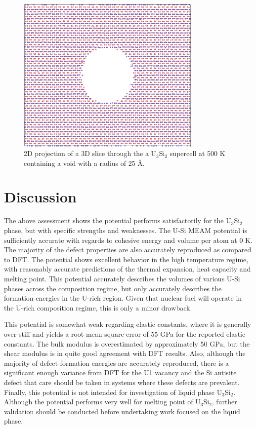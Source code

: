\documentclass[review]{elsarticle}
\begin{document}
\begin{figure}[bt]
	\centering
	\includegraphics[width=0.8\textwidth]{void3.png}
    \caption{2D projection of a 3D slice through the a U$_{3}$Si$_{2}$ supercell at 500 K containing a void with a radius of 25 {\AA}.  }\label{fig:void}
\end{figure}

\FloatBarrier
\clearpage

\section{Discussion}

The above assessment shows the potential performs satisfactorily for the U$_{3}$Si$_{2}$ phase, but with specific strengths and weaknesses.  The U-Si MEAM potential is sufficiently accurate with regards to cohesive energy and volume per atom at 0 K.  The majority of the defect properties are also accurately reproduced as compared to DFT.  The potential shows excellent behavior in the high temperature regime, with reasonably accurate predictions of the thermal expansion, heat capacity and melting point.  This potential accurately describes the volumes of various U-Si phases across the composition regime, but only accurately describes the formation energies in the U-rich region.  Given that nuclear fuel will operate in the U-rich composition regime, this is only a minor drawback.  

This potential is somewhat weak regarding elastic constants, where it is generally over-stiff and yields a root mean square error of 55 GPa for the reported elastic constants.  The bulk modulus is overestimated by approximately 50 GPa, but the shear modulus is in quite good agreement with DFT results.  Also, although the majority of defect formation energies are accurately reproduced, there is a significant enough variance from DFT for the U1 vacancy and the Si antisite defect that care should be taken in systems where these defects are prevalent.  Finally, this potential is not intended for investigation of liquid phase U$_{3}$Si$_{2}$.  Although the potential performs very well for melting point of U$_{3}$Si$_{2}$, further validation should be conducted before undertaking work focused on the liquid phase. 
\end{document}
